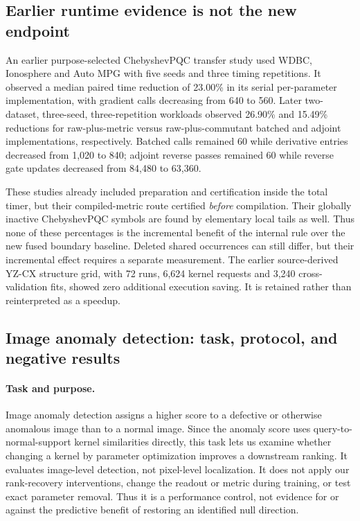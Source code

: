 \subsection{Earlier runtime evidence is not the new endpoint}
An earlier purpose-selected ChebyshevPQC transfer study used WDBC,
Ionosphere and Auto MPG with five seeds and three timing repetitions.
It observed a median paired time reduction of 23.00\% in its serial
per-parameter implementation, with gradient calls decreasing from
640 to 560. Later two-dataset, three-seed, three-repetition workloads
observed 26.90\% and 15.49\% reductions for raw-plus-metric versus
raw-plus-commutant batched and adjoint implementations, respectively.
Batched calls remained 60 while derivative entries decreased from
1,020 to 840; adjoint reverse passes remained 60 while reverse gate
updates decreased from 84,480 to 63,360.

These studies already included preparation and certification inside
the total timer, but their compiled-metric route certified \emph{before}
compilation. Their globally inactive ChebyshevPQC symbols are found
by elementary local tails as well. Thus none of these percentages is
the incremental benefit of the internal rule over the new fused
boundary baseline. Deleted shared occurrences can still differ, but
their incremental effect requires a separate measurement. The earlier
source-derived YZ-CX structure grid, with 72 runs, 6,624 kernel requests
and 3,240 cross-validation fits, showed zero additional execution
saving. It is retained rather than reinterpreted as a speedup.

\subsection{Image anomaly detection: task, protocol, and negative results}
\label{app:visionad}
\paragraph{Task and purpose.}
Image anomaly detection assigns a higher score to a defective or
otherwise anomalous image than to a normal image. Since the anomaly
score uses query-to-normal-support kernel similarities directly,
this task lets us examine whether changing a kernel by parameter
optimization improves a downstream ranking.
It evaluates image-level detection, not pixel-level localization.
It does not apply our rank-recovery interventions, change the readout
or metric during training, or test exact parameter removal.
Thus it is a performance control, not evidence for or against the
predictive benefit of restoring an identified null direction.

